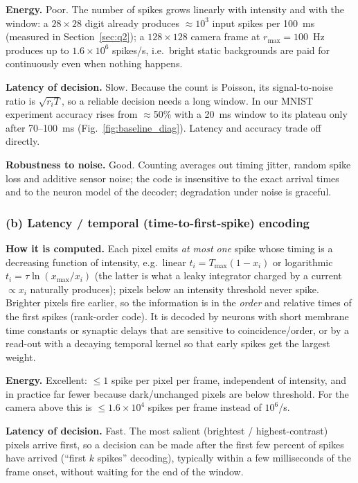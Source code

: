 \documentclass[11pt,a4paper]{article}
\begin{document}
\textbf{Energy.} Poor. The number of spikes grows linearly with intensity and with the window: a $28\times28$ digit already produces $\approx 10^3$ input spikes per 100~ms (measured in Section~\ref{sec:q2}); a $128\times128$ camera frame at $r_{\max}=100$~Hz produces up to $1.6\times10^6$ spikes/s, i.e.\ bright static backgrounds are paid for continuously even when nothing happens.

\textbf{Latency of decision.} Slow. Because the count is Poisson, its signal-to-noise ratio is $\sqrt{r_iT}$, so a reliable decision needs a long window. In our MNIST experiment accuracy rises from $\approx$50\% with a 20~ms window to its plateau only after 70--100~ms (Fig.~\ref{fig:baseline_diag}). Latency and accuracy trade off directly.

\textbf{Robustness to noise.} Good. Counting averages out timing jitter, random spike loss and additive sensor noise; the code is insensitive to the exact arrival times and to the neuron model of the decoder; degradation under noise is graceful.

\subsubsection*{(b) Latency / temporal (time-to-first-spike) encoding}
\textbf{How it is computed.} Each pixel emits \emph{at most one} spike whose timing is a decreasing function of intensity, e.g.\ linear $t_i = T_{\max}(1-x_i)$ or logarithmic $t_i=\tau\ln(x_{\max}/x_i)$ (the latter is what a leaky integrator charged by a current $\propto x_i$ naturally produces); pixels below an intensity threshold never spike. Brighter pixels fire earlier, so the information is in the \emph{order} and relative times of the first spikes (rank-order code). It is decoded by neurons with short membrane time constants or synaptic delays that are sensitive to coincidence/order, or by a read-out with a decaying temporal kernel so that early spikes get the largest weight.

\textbf{Energy.} Excellent: $\le 1$ spike per pixel per frame, independent of intensity, and in practice far fewer because dark/unchanged pixels are below threshold. For the camera above this is $\le 1.6\times10^4$ spikes per frame instead of $10^6$/s.

\textbf{Latency of decision.} Fast. The most salient (brightest / highest-contrast) pixels arrive first, so a decision can be made after the first few percent of spikes have arrived (``first $k$ spikes'' decoding), typically within a few milliseconds of the frame onset, without waiting for the end of the window.
\end{document}
